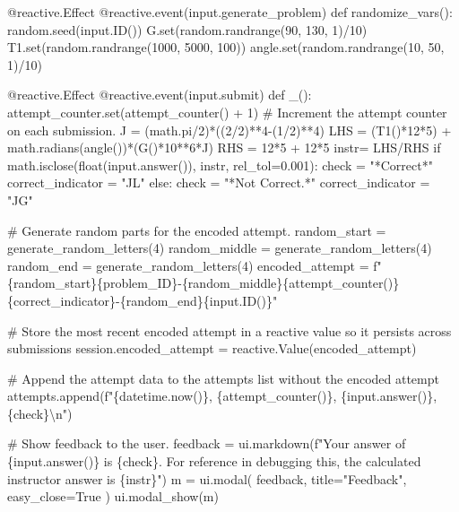\documentclass[
  letterpaper,
  DIV=11,
  numbers=noendperiod]{scrreprt}
\newenvironment{Shaded}{\begin{snugshade}}{\end{snugshade}}
\newcommand{\NormalTok}[1]{\textcolor[rgb]{0.00,0.23,0.31}{#1}}
\begin{document}
\begin{Shaded}
\begin{Highlighting}[]
\NormalTok{    @reactive.Effect}
\NormalTok{    @reactive.event(input.generate\_problem)}
\NormalTok{    def randomize\_vars():}
\NormalTok{        random.seed(input.ID())}
\NormalTok{        G.set(random.randrange(90, 130, 1)/10)}
\NormalTok{        T1.set(random.randrange(1000, 5000, 100))}
\NormalTok{        angle.set(random.randrange(10, 50, 1)/10)}
        
\NormalTok{    @reactive.Effect}
\NormalTok{    @reactive.event(input.submit)}
\NormalTok{    def \_():}
\NormalTok{        attempt\_counter.set(attempt\_counter() + 1)  \# Increment the attempt counter on each submission.}
\NormalTok{        J = (math.pi/2)*((2/2)**4{-}(1/2)**4)}
\NormalTok{        LHS = (T1()*12*5) + math.radians(angle())*(G()*10**6*J)}
\NormalTok{        RHS = 12*5 + 12*5 }
\NormalTok{        instr= LHS/RHS}
\NormalTok{        if math.isclose(float(input.answer()), instr, rel\_tol=0.001):}
\NormalTok{            check = "*Correct*"}
\NormalTok{            correct\_indicator = "JL"}
\NormalTok{        else:}
\NormalTok{            check = "*Not Correct.*"}
\NormalTok{            correct\_indicator = "JG"}

\NormalTok{        \# Generate random parts for the encoded attempt.}
\NormalTok{        random\_start = generate\_random\_letters(4)}
\NormalTok{        random\_middle = generate\_random\_letters(4)}
\NormalTok{        random\_end = generate\_random\_letters(4)}
\NormalTok{        encoded\_attempt = f"\{random\_start\}\{problem\_ID\}{-}\{random\_middle\}\{attempt\_counter()\}\{correct\_indicator\}{-}\{random\_end\}\{input.ID()\}"}

\NormalTok{        \# Store the most recent encoded attempt in a reactive value so it persists across submissions}
\NormalTok{        session.encoded\_attempt = reactive.Value(encoded\_attempt)}

\NormalTok{        \# Append the attempt data to the attempts list without the encoded attempt}
\NormalTok{        attempts.append(f"\{datetime.now()\}, \{attempt\_counter()\}, \{input.answer()\}, \{check\}\textbackslash{}n")}

\NormalTok{        \# Show feedback to the user.}
\NormalTok{        feedback = ui.markdown(f"Your answer of \{input.answer()\} is \{check\}. For reference in debugging this, the calculated instructor answer is \{instr\}")}
\NormalTok{        m = ui.modal(}
\NormalTok{            feedback,}
\NormalTok{            title="Feedback",}
\NormalTok{            easy\_close=True}
\NormalTok{        )}
\NormalTok{        ui.modal\_show(m)}


\end{Highlighting}
\end{Shaded}
\end{document}
